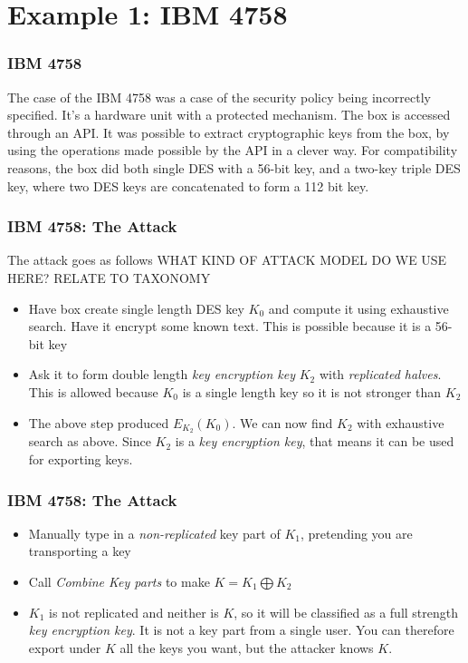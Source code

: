 \section{Example 1: IBM 4758}
        \begin{frame}
            \frametitle{IBM 4758}
                The case of the IBM 4758 was a case of the security policy being incorrectly specified. 
                It's a hardware unit with a protected mechanism. The box is accessed through an API. It was possible to extract cryptographic keys from the box, by using the operations made possible by the API in a clever way. For compatibility reasons, the box did both single DES with a 56-bit key, and a two-key triple DES key, where two DES keys are concatenated to form a 112 bit key. 
        \end{frame}
        \begin{frame}
            \frametitle{IBM 4758: The Attack}
                The attack goes as follows
                WHAT KIND OF ATTACK MODEL DO WE USE HERE? RELATE TO TAXONOMY
                \begin{itemize}
                    \item Have box create single length DES key $K_0$ and compute it using exhaustive search. Have it encrypt some known text. This is possible because it is a 56-bit key
                    \item Ask it to form double length \textit{key encryption key} $K_2$ with \textit{replicated halves}. This is allowed because $K_0$ is a single length key so it is not stronger than $K_2$
                    \item The above step produced $E_{K_2}(K_0)$. We can now find $K_2$ with exhaustive search as above. Since $K_2$ is a \textit{key encryption key}, that means it can be used for exporting keys. 
                \end{itemize}
        \end{frame}
        \begin{frame}
            \frametitle{IBM 4758: The Attack}
                \begin{itemize}
                    \item Manually type in a \textit{non-replicated} key part of $K_1$, pretending you are transporting a key
                    \item Call \textit{Combine Key parts} to make $K = K_1 \bigoplus K_2$
                    \item $K_1$ is not replicated and neither is $K$, so it will be classified as a full strength \textit{key encryption key}. It is not a key part from a single user. You can therefore export under $K$ all the keys you want, but the attacker knows $K$.
                \end{itemize}
        \end{frame}


